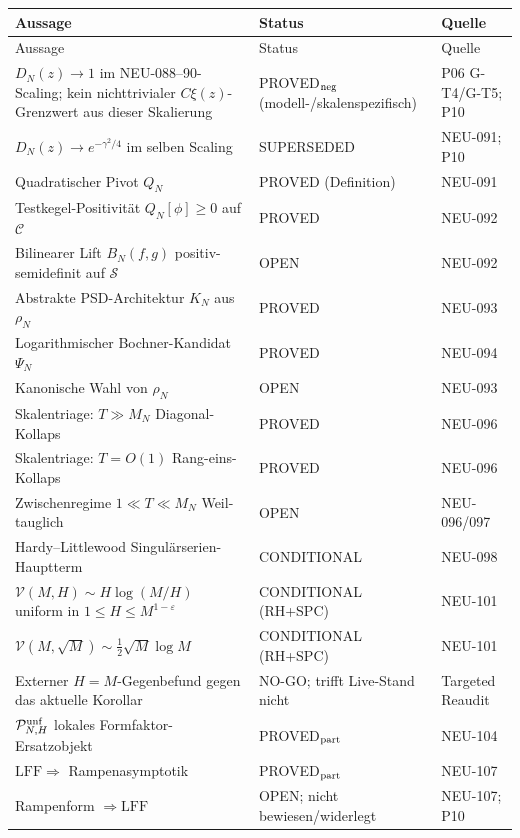 \documentclass[11pt,a4paper]{amsart}
\newcommand{\LFF}{\mathrm{LFF}}
\begin{document}
\small
\begin{longtable}{>{\raggedright\arraybackslash}p{}
                  >{\raggedright\arraybackslash}p{}
                  >{\raggedright\arraybackslash}p{}}
\toprule
Aussage & Status & Quelle\\
\midrule
\endfirsthead
\toprule
Aussage & Status & Quelle\\
\midrule
\endhead
$D_N(z)\to1$ im NEU-088--90-Scaling; kein nichttrivialer $C\xi(z)$-Grenzwert aus dieser Skalierung
& PROVED$_{\rm neg}$ (modell-/skalenspezifisch) & P06 G-T4/G-T5; P10\\
$D_N(z)\to e^{-\gamma^2/4}$ im selben Scaling
& SUPERSEDED & NEU-091; P10\\
Quadratischer Pivot $Q_N$
& PROVED (Definition) & NEU-091\\
Testkegel-Positivität $Q_N[\phi]\ge0$ auf $\mathcal C$
& PROVED & NEU-092\\
Bilinearer Lift $B_N(f,g)$ positiv-semidefinit auf $\mathcal S$
& OPEN & NEU-092\\
Abstrakte PSD-Architektur $K_N$ aus $\rho_N$
& PROVED & NEU-093\\
Logarithmischer Bochner-Kandidat $\Psi_N$
& PROVED & NEU-094\\
Kanonische Wahl von $\rho_N$
& OPEN & NEU-093\\
Skalentriage: $T\gg M_N$ Diagonal-Kollaps
& PROVED & NEU-096\\
Skalentriage: $T=O(1)$ Rang-eins-Kollaps
& PROVED & NEU-096\\
Zwischenregime $1\ll T\ll M_N$ Weil-tauglich
& OPEN & NEU-096/097\\
Hardy--Littlewood Singulärserien-Hauptterm
& CONDITIONAL & NEU-098\\
$\mathcal V(M,H)\sim H\log(M/H)$ uniform in
$1\le H\le M^{1-\varepsilon}$
& CONDITIONAL (RH+SPC) & NEU-101\\
$\mathcal V(M,\sqrt M)\sim\frac12\sqrt M\log M$
& CONDITIONAL (RH+SPC) & NEU-101\\
Externer $H=M$-Gegenbefund gegen das aktuelle Korollar
& NO-GO; trifft Live-Stand nicht & Targeted Reaudit\\
$\mathcal P^{\rm unf}_{N,H}$ lokales Formfaktor-Ersatzobjekt
& PROVED$_{\rm part}$ & NEU-104\\
$\LFF\Rightarrow$ Rampenasymptotik
& PROVED$_{\rm part}$ & NEU-107\\
Rampenform $\Rightarrow\LFF$
& OPEN; nicht bewiesen/widerlegt & NEU-107; P10\\

\end{longtable}
\end{document}
